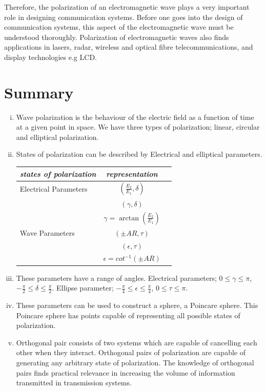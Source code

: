 Therefore, the polarization of an electromagnetic wave plays a very important role in designing communication systems. Before one goes into the design of communication systems, this aspect of the electromagnetic wave must be understood thoroughly. Polarization of electromagnetic waves also finds applications in lasers, radar, wireless and optical fibre telecommunications, and display technologies e.g LCD.

\section{Summary}
\begin{enumerate}[(i)]
\item Wave polarization is the behaviour of the electric field as a function of time at a given point in space. We have three types of polarization; linear, circular and elliptical polarization.
\item States of polarization can be described by Electrical and elliptical parameters.
\begin{tabular}{lccl} 
\multicolumn{2}{c}{\textit{states of polarization}} &\textit{representation} \\ \hline %
Electrical Parameters &          &$ (\frac{E_{2}}{E_{1}}, \delta) $\-          \\        %
&  & $ (\gamma, \delta) $\\   %
&          &$ \gamma = \arctan(\frac{E_{2}}{E_{1}}) $\\  %
Wave Parameters &          &$ (\pm AR, \tau) $\\ %
&          &$ (\epsilon, \tau) $\\  %
&          &$ \epsilon = cot^{-1}(\pm AR) $
\end{tabular}
\item These parameters have a range of angles. Electrical parameters; $ 0 \leq \gamma \leq \pi $, $ -\frac{\pi}{2} \leq \delta \leq \frac{\pi}{2}$. Ellipse parameter; $ -\frac{\pi}{4} \leq \epsilon \leq \frac{\pi}{4}$, $ 0 \leq \tau \leq \pi $.
\item These parameters can be used to construct a sphere, a Poincare sphere. This Poincare sphere has points capable of representing all possible states of polarization.
\item  Orthogonal pair consists of two systems which are capable of cancelling each other when they interact. Orthogonal pairs of polarization are capable of generating any arbitrary state of polarization. The knowledge of orthogonal pairs finds practical relevance in increasing the volume of information transmitted in transmission systems. 

\end{enumerate}
